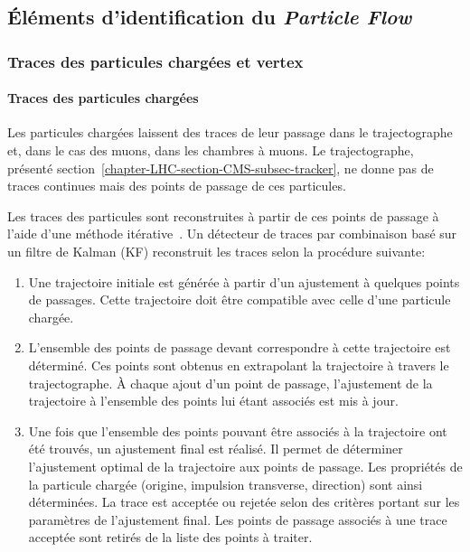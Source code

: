\subsection{Éléments d'identification du \emph{Particle Flow}}\label{chapter-LHC-section-evt_reco-subsec-PF_elements}
\subsubsection{Traces des particules chargées et vertex}\label{chapter-LHC-section-evt_reco-subsec-PF_elements-subsubsec-tracks}
\paragraph{Traces des particules chargées}
Les particules chargées laissent des traces de leur passage dans le trajectographe et, dans le cas des muons, dans les chambres à muons.
Le trajectographe, présenté section~\ref{chapter-LHC-section-CMS-subsec-tracker}, ne donne pas de traces continues mais des points de passage de ces particules.
\par
Les traces des particules sont reconstruites à partir de ces points de passage à l'aide d'une méthode itérative~\cite{particle-flow,track_reco}.
Un détecteur de traces par combinaison basé sur un filtre de Kalman (KF) \cite{Kalman_filter} reconstruit les traces selon la procédure suivante:
\begin{enumerate}
\item Une trajectoire initiale est générée à partir d'un ajustement à quelques points de passages.
Cette trajectoire doit être compatible avec celle d'une particule chargée.
\item L'ensemble des points de passage devant correspondre à cette trajectoire est déterminé.
Ces points sont obtenus en extrapolant la trajectoire à travers le trajectographe.
À chaque ajout d'un point de passage, l'ajustement de la trajectoire à l'ensemble des points lui étant associés est mis à jour.
\item Une fois que l'ensemble des points pouvant être associés à la trajectoire ont été trouvés, un ajustement final est réalisé.
Il permet de déterminer l'ajustement optimal de la trajectoire aux points de passage.
Les propriétés de la particule chargée (origine, impulsion transverse, direction) sont ainsi déterminées.
La trace est acceptée ou rejetée selon des critères portant sur les paramètres de l'ajustement final.
Les points de passage associés à une trace acceptée sont retirés de la liste des points à traiter.
\end{enumerate}
